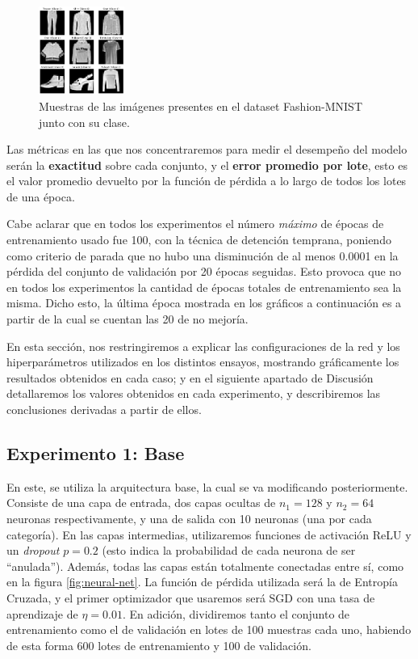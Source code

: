 \documentclass[aps,twocolumn,groupedaddress]{revtex4-2}
\begin{document}
\begin{figure}[h!]
    \centering
    \includegraphics[width=0.25\textwidth]{figs/fashion-mnist-samples.png}
    \caption{Muestras de las imágenes presentes en el dataset Fashion-MNIST junto con su clase.}
    \label{fig:fashion-mnist-samples}
\end{figure}

Las métricas en las que nos concentraremos para medir el desempeño del modelo serán la \textbf{exactitud} sobre cada conjunto, y el \textbf{error promedio por lote}, esto es el valor promedio devuelto por la función de pérdida a lo largo de todos los lotes de una época. 

Cabe aclarar que en todos los experimentos el número \textit{máximo} de épocas de entrenamiento usado fue 100, con la técnica de detención temprana, poniendo como criterio de parada que no hubo una disminución de al menos 0.0001 en la pérdida del conjunto de validación por 20 épocas seguidas. Esto provoca que no en todos los experimentos la cantidad de épocas totales de entrenamiento sea la misma. Dicho esto, la última época mostrada en los gráficos  a continuación es a partir de la cual se cuentan las 20 de no mejoría.

En esta sección, nos restringiremos a explicar las configuraciones de la red y los hiperparámetros utilizados en los distintos ensayos, mostrando gráficamente los resultados obtenidos en cada caso; y en el siguiente apartado de Discusión detallaremos los valores obtenidos en cada experimento, y describiremos las conclusiones derivadas a partir de ellos.

\subsection{Experimento 1: Base}
En este, se utiliza la arquitectura base, la cual se va modificando posteriormente. Consiste de una capa de entrada, dos capas ocultas de \(n_1=128\) y \(n_2=64\) neuronas respectivamente, y una de salida con 10 neuronas (una por cada categoría). En las capas intermedias, utilizaremos funciones de activación ReLU y un \textit{dropout} \(p=0.2\) (esto indica la probabilidad de cada neurona de ser ``anulada''). Además, todas las capas están totalmente conectadas entre sí, como en la figura \ref{fig:neural-net}. La función de pérdida utilizada será la de Entropía Cruzada, y el primer optimizador que usaremos será SGD con una tasa de aprendizaje de \(\eta=0.01\). En adición, dividiremos tanto el conjunto de entrenamiento como el de validación en lotes de 100 muestras cada uno, habiendo de esta forma 600 lotes de entrenamiento y 100 de validación.
\end{document}
